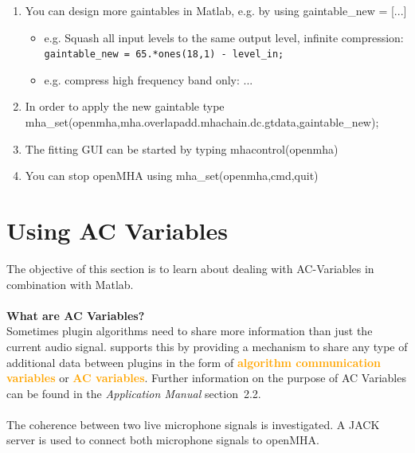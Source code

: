 \documentclass[11pt,a4paper,twoside]{article}
\newcommand{\+}{\discretionary{\mbox{\scriptsize$\hookleftarrow$}}{}{}}
\begin{document}
{{\begin{enumerate}
\item You can design more gaintables in Matlab, e.g. by using 
  {\ttfamily gaintable\_new = [...]}
  \begin{itemize}
  \item e.g. Squash all input levels to the same output level, infinite compression:
    \\ \texttt{gaintable\_new = 65.*ones(18,1) - level\_in;}
  \item e.g. compress high frequency band only: ...
  \end{itemize}
\item In order to apply the new gaintable type \\
{\ttfamily mha\_set(openmha,\textquotesingle{}mha.overlapadd.mhachain.dc.gtdata\textquotesingle{},gaintable\_new);}
\item The fitting GUI can be started by typing {\ttfamily mhacontrol(openmha)}
\item You can stop openMHA using {\ttfamily mha\_set(openmha,\textquotesingle{}cmd\textquotesingle{},\textquotesingle{}quit\textquotesingle{})}



\end{enumerate}
\newpage
\section{Using AC Variables}
\label{sec:ac_variables}

The objective of this section is to learn about dealing with AC-Variables in combination with Matlab. \\ \\

\textbf{What are AC Variables?} \\

Sometimes plugin algorithms need to share more information than just the current audio signal. \mha{} supports this by providing a mechanism to share any type of additional data between plugins in the form of \textcolor{orange}{\textbf{algorithm communication variables}} or \textcolor{orange}{\textbf{AC variables}}. Further information on the purpose of AC Variables can be found in the \textit{Application Manual} section~2.2. \\

\dotfill \\

The coherence between two live microphone signals is investigated. A JACK server is used to connect both microphone signals to openMHA.  

}}
\end{document}
